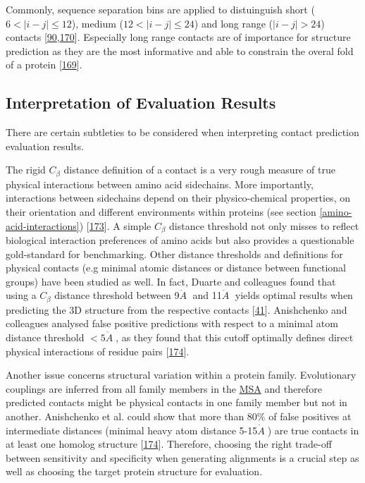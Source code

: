 \documentclass[11pt,a4paper,twoside]{book}
\newcommand{\Cb}{C_\beta}
\newcommand{\angstrom}{\mathring{A} \;}
\theoremstyle{definition}
\theoremstyle{definition}
\theoremstyle{remark}
\begin{document}
Commonly, sequence separation bins are applied to distuinguish short
(\(6 < |i-j| \le 12\)), medium (\(12 < |i-j| \le 24\)) and long range
(\(|i-j| > 24\)) contacts
{[}\protect\hyperlink{ref-Monastyrskyy2015}{90},\protect\hyperlink{ref-Monastyrskyy2014a}{170}{]}.
Especially long range contacts are of importance for structure
prediction as they are the most informative and able to constrain the
overal fold of a protein
{[}\protect\hyperlink{ref-Monastyrskyy2011}{169}{]}.

\subsection{Interpretation of Evaluation
Results}\label{interpretation-of-evaluation-results}

There are certain subtleties to be considered when interpreting contact
prediction evaluation results.

The rigid \(\Cb\) distance definition of a contact is a very rough
measure of true physical interactions between amino acid sidechains.
More importantly, interactions between sidechains depend on their
physico-chemical properties, on their orientation and different
environments within proteins (see section \ref{amino-acid-interactions})
{[}\protect\hyperlink{ref-Bettsa}{173}{]}. A simple \(\Cb\) distance
threshold not only misses to reflect biological interaction preferences
of amino acids but also provides a questionable gold-standard for
benchmarking. Other distance thresholds and definitions for physical
contacts (e.g minimal atomic distances or distance between functional
groups) have been studied as well. In fact, Duarte and colleagues found
that using a \(\Cb\) distance threshold between 9\(\angstrom\) and
11\(\angstrom\) yields optimal results when predicting the 3D structure
from the respective contacts
{[}\protect\hyperlink{ref-Duarte2010}{41}{]}. Anishchenko and colleagues
analysed false positive predictions with respect to a minimal atom
distance threshold \(< 5 \angstrom\), as they found that this cutoff
optimally defines direct physical interactions of residue pairs
{[}\protect\hyperlink{ref-Anishchenko2017}{174}{]}.

Another issue concerns structural variation within a protein family.
Evolutionary couplings are inferred from all family members in the
\protect\hyperlink{abbrev}{MSA} and therefore predicted contacts might
be physical contacts in one family member but not in another.
Anishchenko et al. could show that more than \(80\%\) of false positives
at intermediate distances (minimal heavy atom distance
5-15\(\angstrom\)) are true contacts in at least one homolog structure
{[}\protect\hyperlink{ref-Anishchenko2017}{174}{]}. Therefore, choosing
the right trade-off between sensitivity and specificity when generating
alignments is a crucial step as well as choosing the target protein
structure for evaluation.
\end{document}
